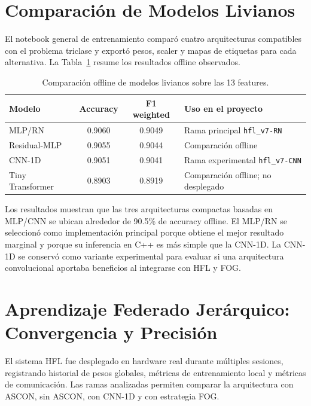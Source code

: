 \section{Comparación de Modelos Livianos}
\label{sec:res_modelos_livianos}

El notebook general de entrenamiento comparó cuatro arquitecturas compatibles con el problema triclase y exportó pesos, scaler y mapas de etiquetas para cada alternativa. La Tabla~\ref{tab:light_models_results} resume los resultados offline observados.

\begin{table}[H]
\centering
\caption{Comparación offline de modelos livianos sobre las 13 features.}
\label{tab:light_models_results}
\small
\begin{tabular}{l c c l}
\toprule
\textbf{Modelo} & \textbf{Accuracy} & \textbf{F1 weighted} & \textbf{Uso en el proyecto} \\
\midrule
MLP/RN          & 0.9060 & 0.9049 & Rama principal \texttt{hfl\_v7-RN} \\
Residual-MLP    & 0.9055 & 0.9044 & Comparación offline \\
CNN-1D          & 0.9051 & 0.9041 & Rama experimental \texttt{hfl\_v7-CNN} \\
Tiny Transformer & 0.8903 & 0.8919 & Comparación offline; no desplegado \\
\bottomrule
\end{tabular}
\end{table}

Los resultados muestran que las tres arquitecturas compactas basadas en MLP/CNN se ubican alrededor de 90.5\% de accuracy offline. El MLP/RN se seleccionó como implementación principal porque obtiene el mejor resultado marginal y porque su inferencia en C++ es más simple que la CNN-1D. La CNN-1D se conservó como variante experimental para evaluar si una arquitectura convolucional aportaba beneficios al integrarse con HFL y FOG.

\section{Aprendizaje Federado Jerárquico: Convergencia y Precisión}
\label{sec:res_hfl}

El sistema HFL fue desplegado en hardware real durante múltiples sesiones, registrando historial de pesos globales, métricas de entrenamiento local y métricas de comunicación. Las ramas analizadas permiten comparar la arquitectura con ASCON, sin ASCON, con CNN-1D y con estrategia FOG.

